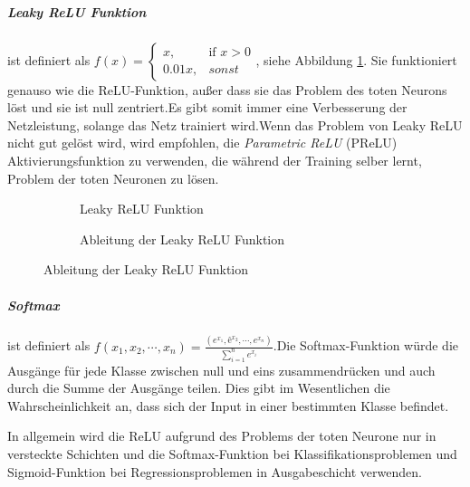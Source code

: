 \documentclass[12pt,a4paper]{scrartcl}
\numberwithin{equation}{section}
\begin{document}
\subparagraph{Leaky ReLU Funktion} ist definiert als $  f(x)= 
\begin{cases}
x,& \text{if } x  >  0\\
0.01x,              & sonst
\end{cases} $, siehe Abbildung \ref{fig:LReLU}. Sie funktioniert genauso wie die ReLU-Funktion, außer dass sie das Problem des toten Neurons löst und sie ist null zentriert.Es gibt somit immer eine Verbesserung der Netzleistung, solange das Netz trainiert wird.Wenn das Problem von Leaky ReLU nicht gut gelöst wird, wird empfohlen, die \textit{Parametric ReLU }(PReLU) Aktivierungsfunktion zu verwenden, die während der Training selber lernt, Problem der toten Neuronen zu lösen.
\begin{figure}[ht]
	\caption{Leaky ReLU Funktion}
	\begin{subfigure}{.5\textwidth}
		\centering
		\caption{Leaky ReLU Funktion}
	\end{subfigure}%
	\begin{subfigure}{.5\textwidth}
		\centering
		\caption{Ableitung der Leaky ReLU Funktion}
	\end{subfigure}
	
	\label{fig:LReLU}
	
\end{figure}




\subparagraph{Softmax} ist definiert als $ f(x_1, x_2, \cdots, x_n) = \frac{(e^{x_1}, ê^{x_2}, \cdots, e^{x_n})}{\sum_{i =1}^{n}{e^{x_i}}} $.Die Softmax-Funktion würde die Ausgänge für jede Klasse zwischen null und eins zusammendrücken und auch durch die Summe der Ausgänge teilen. Dies gibt im Wesentlichen die Wahrscheinlichkeit an, dass sich der Input in einer bestimmten Klasse befindet. 

In allgemein wird die ReLU aufgrund des Problems der toten Neurone nur in versteckte Schichten und die Softmax-Funktion bei Klassifikationsproblemen und Sigmoid-Funktion bei Regressionsproblemen in Ausgabeschicht verwenden.
\end{document}
